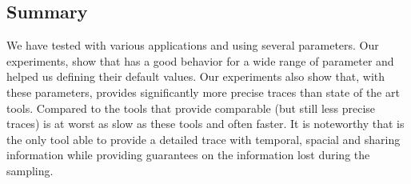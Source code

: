 \subsection{Summary}
\label{sec:expe-cncl}

We have tested \Moca with various applications and using several parameters.
Our experiments, show that \Moca has a good behavior for a wide range of
parameter and helped us defining their default values. Our experiments also
show that, with these parameters, provides significantly more precise traces
than state of the art tools. Compared to the tools that provide comparable
(but still less precise traces) \Moca is at worst as slow as these tools and
often faster.  It is noteworthy that \Moca is the only tool able to provide a
detailed trace with temporal, spacial and sharing information while providing
guarantees on the information lost during the sampling.
